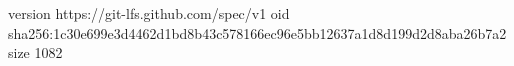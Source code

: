 version https://git-lfs.github.com/spec/v1
oid sha256:1c30e699e3d4462d1bd8b43c578166ec96e5bb12637a1d8d199d2d8aba26b7a2
size 1082
